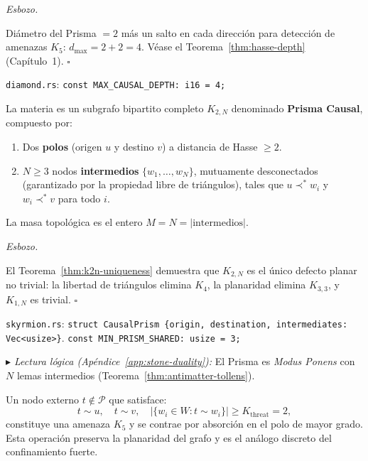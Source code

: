 \documentclass[11pt, a4paper, openany]{book}
\newcommand{\covers}{\prec^{\!*}}
\newcommand{\stoneref}[1]{%
  \smallskip\noindent
  {\small\color{structure!70}\textit{$\blacktriangleright$ Lectura
  l\'ogica (Ap\'endice~\ref{app:stone-duality}):} #1}%
  \smallskip}
\renewenvironment{proof}[1][Demostraci\'on]{%
  \par\noindent\textit{#1.}\quad
}{\hfill$\square$\par\medskip}
\begin{document}
\begin{proof}[Esbozo]
Di\'ametro del Prisma $= 2$ m\'as un salto en cada direcci\'on para
detecci\'on de amenazas $K_5$: $d_{\max} = 2 + 2 = 4$.
V\'ease el Teorema~\ref{thm:hasse-depth} (Cap\'itulo~1).
\end{proof}

\medskip\noindent
\texttt{diamond.rs}: \texttt{const MAX\_CAUSAL\_DEPTH: i16 = 4;}

\begin{theorem}
\label{thm:bipartite-matter}
La materia es un subgrafo bipartito completo $K_{2,N}$
denominado \textbf{Prisma Causal}, compuesto por:
\begin{enumerate}
  \item Dos \textbf{polos} (origen $u$ y destino $v$) a distancia
    de Hasse $\geq 2$.
  \item $N \geq 3$ nodos \textbf{intermedios} $\{w_1,\ldots,w_N\}$,
    mutuamente desconectados (garantizado por la propiedad
    libre de tri\'angulos), tales que $u \covers w_i$ y
    $w_i \covers v$ para todo $i$.
\end{enumerate}
La masa topol\'ogica es el entero $M = N = |\text{intermedios}|$.
\end{theorem}

\begin{proof}[Esbozo]
El Teorema~\ref{thm:k2n-uniqueness} demuestra que $K_{2,N}$ es el
\'unico defecto planar no trivial: la libertad de tri\'angulos elimina
$K_4$, la planaridad elimina $K_{3,3}$, y $K_{1,N}$ es trivial.
\end{proof}

\medskip\noindent
\texttt{skyrmion.rs}: \texttt{struct CausalPrism \{origin,
destination, intermediates: Vec<usize>\}}.
\texttt{const MIN\_PRISM\_SHARED: usize = 3;}

\stoneref{El Prisma es \emph{Modus Ponens} con $N$ lemas intermedios
(Teorema~\ref{thm:antimatter-tollens}).}

\begin{theorem}
\label{thm:kuratowski-threat}
Un nodo externo $t \notin \mathcal{P}$ que satisface:
\begin{equation}
  t \sim u,\quad t \sim v,\quad |\{w_i \in W : t \sim w_i\}|
  \geq K_{\text{threat}} = 2,
  \label{eq:ax-threat}
\end{equation}
constituye una amenaza $K_5$ y se contrae por absorci\'on en el
polo de mayor grado. Esta operaci\'on preserva la planaridad
del grafo y es el an\'alogo discreto del confinamiento fuerte.
\end{theorem}
\end{document}
